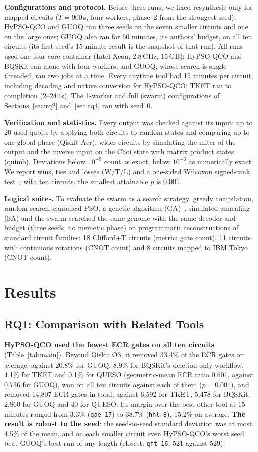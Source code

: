 \documentclass[conference,letterpaper]{IEEEtran}
\newcommand{\cir}[1]{\texttt{#1}}
\newcommand{\hypso}{HyPSO-QCO}
\begin{document}
\textbf{Configurations and protocol.} Before these runs, we fixed resynthesis only for mapped circuits
($T = 900$\,s, four workers, phase~2 from the strongest seed). \hypso{} and GUOQ ran three seeds on the seven
smaller circuits and one on the large ones; GUOQ also ran for 60 minutes, its authors' budget, on all ten
circuits (its first seed's 15-minute result is the snapshot of that run). All runs used one four-core
container (Intel Xeon, 2.8\,GHz, 15\,GB); \hypso{} and BQSKit ran alone with four workers, and GUOQ, whose
search is single-threaded, ran two jobs at a time. Every anytime tool had 15 minutes per circuit, including
decoding and native conversion for \hypso{}; TKET ran to completion (2--244\,s). The 1-worker and full
(swarm) configurations of Sections~\ref{sec:rq2} and~\ref{sec:rq4} ran with seed~0.

\textbf{Verification and statistics.} Every output was checked against its input: up to 20 used qubits by
applying both circuits to random states and comparing up to one global phase (Qiskit Aer), wider circuits by
simulating the miter of the output and the inverse input on the Choi state with matrix product states
(quimb). Deviations below $10^{-9}$ count as exact, below $10^{-6}$ as numerically exact. We report wins,
ties and losses (W/T/L) and a one-sided Wilcoxon signed-rank test~\cite{conover}; with ten circuits, the
smallest attainable $p$ is 0.001.

\textbf{Logical suites.} To evaluate the swarm as a search strategy, greedy compilation, random search,
canonical PSO, a genetic algorithm (GA)~\cite{eiben}, simulated annealing (SA) and the swarm searched the
same genome with the same decoder and budget (three seeds, no memetic phase) on programmatic reconstructions
of standard circuit families: 18 Clifford+T circuits (metric: gate count), 11 circuits with continuous
rotations (CNOT count) and 8 circuits mapped to IBM Tokyo (CNOT count).

\section{Results}\label{sec:results}

\subsection{RQ1: Comparison with Related Tools}
\textbf{\hypso{} used the fewest ECR gates on all ten circuits} (Table~\ref{tab:main}). Beyond Qiskit O3, it
removed 33.4\% of the ECR gates on average, against 20.8\% for GUOQ, 8.9\% for BQSKit's deletion-only
workflow, 4.1\% for TKET and 0.1\% for QUESO (geometric-mean ECR ratio 0.601, against 0.736 for GUOQ), won on
all ten circuits against each of them ($p = 0.001$), and removed 14,807 ECR gates in total, against 6,592 for
TKET, 5,478 for BQSKit, 2,860 for GUOQ and 40 for QUESO. Its margin over the best other tool at 15 minutes
ranged from 3.3\% (\cir{qae\_17}) to 38.7\% (\cir{hhl\_8}), 15.2\% on average. \textbf{The result is robust to
the seed}: the seed-to-seed standard deviation was at most 4.5\% of the mean, and on each smaller circuit even
\hypso{}'s worst seed beat GUOQ's best run of any length (closest: \cir{qft\_16}, 521 against 529).
\end{document}
